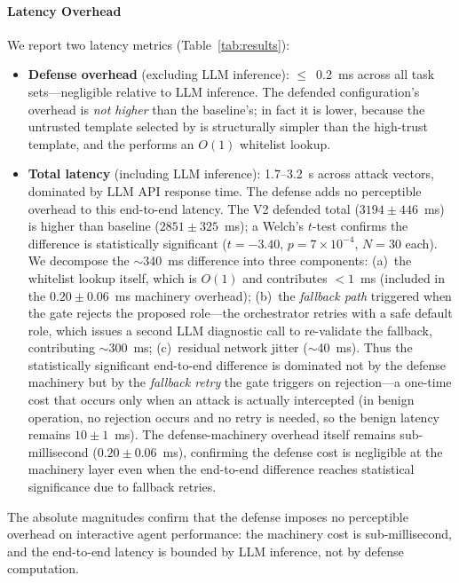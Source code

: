 \paragraph{Latency Overhead}
We report two latency metrics (Table~\ref{tab:results}):

\begin{itemize}[leftmargin=*]
    \item \textbf{Defense overhead} (excluding LLM inference): $\leq$~0.2~ms across all task sets---negligible relative to LLM inference. The defended configuration's overhead is \emph{not higher} than the baseline's; in fact it is lower, because the untrusted template selected by \trustorigin{} is structurally simpler than the high-trust template, and the \reauthgate{} performs an $O(1)$ whitelist lookup.
    \item \textbf{Total latency} (including LLM inference): 1.7--3.2~s across attack vectors, dominated by LLM API response time. The defense adds no perceptible overhead to this end-to-end latency. The V2 defended total ($3194{\pm}446$~ms) is higher than baseline ($2851{\pm}325$~ms); a Welch's $t$-test confirms the difference is statistically significant ($t{=}{-}3.40$, $p{=}7{\times}10^{-4}$, $N{=}30$ each). We decompose the $\sim$340~ms difference into three components: (a)~the \reauthgate{} whitelist lookup itself, which is $O(1)$ and contributes $<1$~ms (included in the $0.20{\pm}0.06$~ms machinery overhead); (b)~the \emph{fallback path} triggered when the gate rejects the proposed role---the orchestrator retries with a safe default role, which issues a second LLM diagnostic call to re-validate the fallback, contributing $\sim$300~ms; (c)~residual network jitter ($\sim$40~ms). Thus the statistically significant end-to-end difference is dominated not by the defense machinery but by the \emph{fallback retry} the gate triggers on rejection---a one-time cost that occurs only when an attack is actually intercepted (in benign operation, no rejection occurs and no retry is needed, so the benign latency remains $10{\pm}1$~ms). The defense-machinery overhead itself remains sub-millisecond ($0.20{\pm}0.06$~ms), confirming the defense cost is negligible at the machinery layer even when the end-to-end difference reaches statistical significance due to fallback retries.
\end{itemize}

The absolute magnitudes confirm that the defense imposes no perceptible overhead on interactive agent performance: the machinery cost is sub-millisecond, and the end-to-end latency is bounded by LLM inference, not by defense computation.


